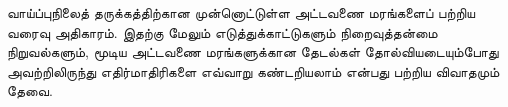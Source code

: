 \documentclass[../../../include/open-logic-chapter]{subfiles}
\begin{document}

\begin{editorial}
  வாய்ப்புநிலைத் தருக்கத்திற்கான முன்னொட்டுள்ள அட்டவணை மரங்களைப் பற்றிய வரைவு
  அதிகாரம். இதற்கு மேலும் எடுத்துக்காட்டுகளும் நிறைவுத்தன்மை நிறுவல்களும்,
  மூடிய அட்டவணை மரங்களுக்கான தேடல்கள் தோல்வியடையும்போது அவற்றிலிருந்து
  எதிர்மாதிரிகளை எவ்வாறு கண்டறியலாம் என்பது பற்றிய விவாதமும் தேவை.
\end{editorial}


\OLEndChapterHook
\end{document}
